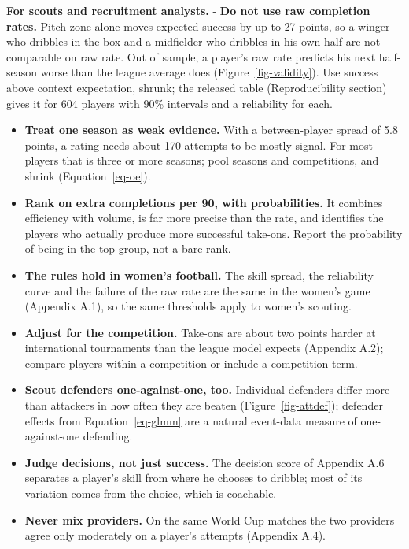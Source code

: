 \documentclass[
  12pt]{article}
\begin{document}
\textbf{For scouts and recruitment analysts.} - \textbf{Do not use raw
completion rates.} Pitch zone alone moves expected success by up to 27
points, so a winger who dribbles in the box and a midfielder who
dribbles in his own half are not comparable on raw rate. Out of sample,
a player's raw rate predicts his next half-season worse than the league
average does (Figure~\ref{fig-validity}). Use success above context
expectation, shrunk; the released table (Reproducibility section) gives
it for 604 players with 90\% intervals and a reliability for each.

\begin{itemize}
\item
  \textbf{Treat one season as weak evidence.} With a between-player
  spread of 5.8 points, a rating needs about 170 attempts to be mostly
  signal. For most players that is three or more seasons; pool seasons
  and competitions, and shrink (Equation~\ref{eq-oe}).
\item
  \textbf{Rank on extra completions per 90, with probabilities.} It
  combines efficiency with volume, is far more precise than the rate,
  and identifies the players who actually produce more successful
  take-ons. Report the probability of being in the top group, not a bare
  rank.
\item
  \textbf{The rules hold in women's football.} The skill spread, the
  reliability curve and the failure of the raw rate are the same in the
  women's game (Appendix A.1), so the same thresholds apply to women's
  scouting.
\item
  \textbf{Adjust for the competition.} Take-ons are about two points
  harder at international tournaments than the league model expects
  (Appendix A.2); compare players within a competition or include a
  competition term.
\item
  \textbf{Scout defenders one-against-one, too.} Individual defenders
  differ more than attackers in how often they are beaten
  (Figure~\ref{fig-attdef}); defender effects from
  Equation~\ref{eq-glmm} are a natural event-data measure of
  one-against-one defending.
\item
  \textbf{Judge decisions, not just success.} The decision score of
  Appendix A.6 separates a player's skill from where he chooses to
  dribble; most of its variation comes from the choice, which is
  coachable.
\item
  \textbf{Never mix providers.} On the same World Cup matches the two
  providers agree only moderately on a player's attempts (Appendix A.4).
\end{itemize}
\end{document}
